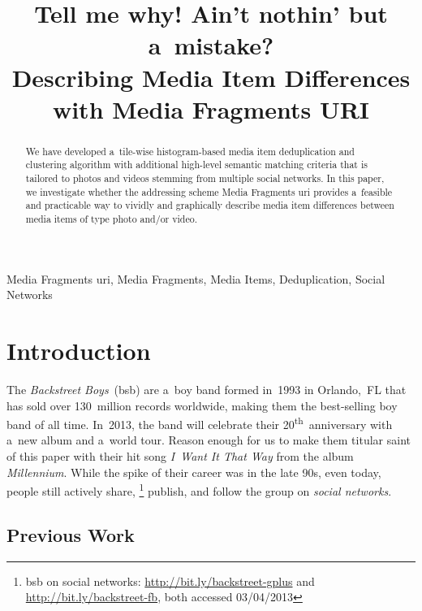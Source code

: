 \documentclass{article}
\begin{document}
\sloppy

\newcommand{\ts}{\textsuperscript}

\title{Tell me why! Ain't nothin' but a~mistake?\\ Describing Media Item Differences with Media Fragments URI}
%
\address{}

\maketitle

%
\begin{abstract}
We have developed a~tile-wise histogram-based
media item deduplication and clustering algorithm
with additional high-level semantic matching criteria
that is tailored to photos and videos stemming from multiple social networks.
In this paper, we investigate whether the addressing scheme
Media Fragments  {\sc uri} provides a~feasible and practicable way
to vividly and graphically describe media item differences
between media items of type photo and/or video.
\end{abstract}
%
\begin{keywords}
Media Fragments {\sc uri}, Media Fragments, Media Items, Deduplication, Social Networks
\end{keywords}
%
\section{Introduction}
\label{sec:introduction}

The \emph{Backstreet Boys}~({\sc bsb}) are a~boy band
formed in~1993 in Orlando,~FL
that has sold over 130~million records worldwide,
making them the best-selling boy band of all time.
In~2013, the band will celebrate their 20\ts{th}~anniversary
with a~new album and a~world tour.
Reason enough for us to make them titular saint of this paper
with their hit song \emph{I~Want It That Way}
from the album \emph{Millennium}.
While the spike of their career was in the late 90s,
even today, people still actively share,%
\footnote{{\sc bsb} on social networks: \url{http://bit.ly/backstreet-gplus}
and \url{http://bit.ly/backstreet-fb},
both accessed 03/04/2013}
publish, and follow the group on \emph{social networks}.

\subsection{Previous Work}
\label{sec:previous-work}
\end{document}
